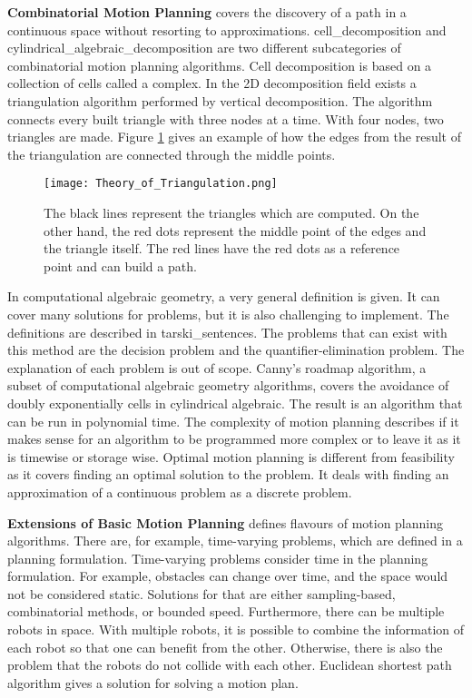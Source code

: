 \textbf{Combinatorial Motion Planning} covers the discovery of a path in a continuous space without resorting to approximations. \Gls{cell_decomposition} and \Gls{cylindrical_algebraic_decomposition} are two different subcategories of combinatorial motion planning algorithms. Cell decomposition is based on a collection of cells called a complex. In the 2D decomposition field exists a triangulation algorithm performed by vertical decomposition. The algorithm connects every built triangle with three nodes at a time. With four nodes, two triangles are made. Figure \ref{fig:Theory of Triangulation} gives an example of how the edges from the result of the triangulation are connected through the middle points.
\begin{figure}[H]
    \centering
    \texttt{[image: Theory\_of\_Triangulation.png]}
    \caption{The black lines represent the triangles which are computed. On the other hand, the red dots represent the middle point of the edges and the triangle itself. The red lines have the red dots as a reference point and can build a path. \cite{planning_algorithms_steven_m_lavalle}}
    \label{fig:Theory of Triangulation}
\end{figure}
In computational algebraic geometry, a very general definition is given. It can cover many solutions for problems, but it is also challenging to implement. The definitions are described in \Gls{tarski_sentences}. The problems that can exist with this method are the decision problem and the quantifier-elimination problem. The explanation of each problem is out of scope. Canny's roadmap algorithm, a subset of computational algebraic geometry algorithms, covers the avoidance of doubly exponentially cells in cylindrical algebraic. \cite{constructing_roadmaps_of_semi-algebraic_sets_I} The result is an algorithm that can be run in polynomial time. The complexity of motion planning describes if it makes sense for an algorithm to be programmed more complex or to leave it as it is timewise or storage wise. Optimal motion planning is different from feasibility as it covers finding an optimal solution to the problem. It deals with finding an approximation of a continuous problem as a discrete problem. \cite{planning_algorithms_steven_m_lavalle}

\textbf{Extensions of Basic Motion Planning} defines flavours of motion planning algorithms. There are, for example, time-varying problems, which are defined in a planning formulation. Time-varying problems consider time in the planning formulation. For example, obstacles can change over time, and the space would not be considered static. Solutions for that are either sampling-based, combinatorial methods, or bounded speed. Furthermore, there can be multiple robots in space. With multiple robots, it is possible to combine the information of each robot so that one can benefit from the other. Otherwise, there is also the problem that the robots do not collide with each other. \cite{planning_algorithms_steven_m_lavalle} Euclidean shortest path algorithm gives a solution for solving a motion plan. \cite{efficient_computation_of_euclidean_shortest_paths_in_the_plane}

